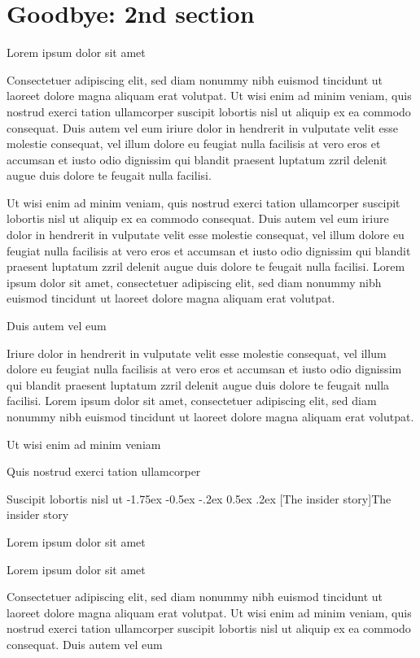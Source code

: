 \documentclass[11pt,twoside]{article}\makeatletter
\makeatletter
\renewcommand\section{\@startsection {section}{1}{\z@}%
     {-1.75ex \@plus -0.5ex \@minus -.2ex}%
     {0.5ex \@plus .2ex}%
     {\reset@font\Large\bfseries\sffamily}}
\renewcommand\subsection{\@startsection{subsection}{2}{\z@}%
     {-1.75ex\@plus -0.5ex \@minus- .2ex}%
     {0.5ex \@plus .2ex}%
     {\reset@font\Large\sffamily}}
\def\DivI{\section}
\def\DivII{\subsection}
\def\DivI{\chapter}
\def\DivII{\section}
\makeatother
\begin{document}
\DivI[Goodbye: 2nd section]{Goodbye: 2nd section}\label{part2}\par Lorem ipsum dolor sit amet\par Consectetuer adipiscing elit, sed diam nonummy nibh euismod
      tincidunt ut laoreet dolore magna aliquam erat volutpat. Ut wisi enim
      ad minim veniam, quis nostrud exerci tation ullamcorper suscipit
      lobortis nisl ut aliquip ex ea commodo consequat. Duis autem vel eum
      iriure dolor in hendrerit in vulputate velit esse molestie consequat,
      vel illum dolore eu feugiat nulla facilisis at vero eros et accumsan
      et iusto odio dignissim qui blandit praesent luptatum zzril delenit
      augue duis dolore te feugait nulla facilisi.\par Ut wisi enim ad minim veniam, quis nostrud exerci tation
      ullamcorper suscipit lobortis nisl ut aliquip ex ea commodo
      consequat. Duis autem vel eum iriure dolor in hendrerit in vulputate
      velit esse molestie consequat, vel illum dolore eu feugiat nulla
      facilisis at vero eros et accumsan et iusto odio dignissim qui blandit
      praesent luptatum zzril delenit augue duis dolore te feugait nulla
      facilisi. Lorem ipsum dolor sit amet, consectetuer adipiscing elit,
      sed diam nonummy nibh euismod tincidunt ut laoreet dolore magna
      aliquam erat volutpat. \par Duis autem vel eum \par Iriure dolor in hendrerit in vulputate velit esse molestie
      consequat, vel illum dolore eu feugiat nulla facilisis at vero eros et
      accumsan et iusto odio dignissim qui blandit praesent luptatum zzril
      delenit augue duis dolore te feugait nulla facilisi. Lorem ipsum dolor
      sit amet, consectetuer adipiscing elit, sed diam nonummy nibh euismod
      tincidunt ut laoreet dolore magna aliquam erat volutpat. \par Ut wisi enim ad minim veniam\par Quis nostrud exerci tation ullamcorper \par Suscipit lobortis nisl ut 
\DivII[The insider story]{The insider story}\label{part2.1}\par Lorem ipsum dolor sit amet\par Lorem ipsum dolor sit amet\par Consectetuer adipiscing elit, sed diam nonummy nibh euismod
      tincidunt ut laoreet dolore magna aliquam erat volutpat. Ut wisi enim
      ad minim veniam, quis nostrud exerci tation ullamcorper suscipit
      lobortis nisl ut aliquip ex ea commodo consequat. Duis autem vel eum
\end{document}
